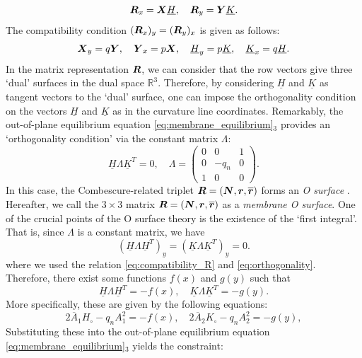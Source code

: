 \documentclass[a4paper]{amsart}
\def\br{\mbox{\boldmath $r$}}
\def\bH{\underline{H}}
\def\bK{\underline{K}}
\def\bN{\mbox{\boldmath $N$}}
\def\R{\mathbb{R}}
\def\bR{\mbox{\boldmath $R$}}
\def\bX{\mbox{\boldmath $X$}}
\def\bY{\mbox{\boldmath $Y$}}
\theoremstyle{definition}
\begin{document}
\begin{equation}
\bR_x = \bX \bH, \quad
\bR_y = \bY \bK.
\end{equation}
The compatibility condition $(\bR_x)_y = (\bR_y)_x$ is given as follows:
\begin{equation}
\label{eq:compatibility_R}
\bX_y = q \bY, \quad
\bY_x = p \bX, \quad
\bH_y = p \bK, \quad
\bK_x = q \bH.
\end{equation}
In the matrix representation $\bR$, we can consider that the row vectors give three `dual' surfaces in the dual space $\R^3$.
Therefore, by considering $\bH$ and $\bK$ as tangent vectors to the `dual' surface, one can impose the orthogonality condition on the vectors $\bH$ and $\bK$ as in the curvature line coordinates.
Remarkably, the out-of-plane equilibrium equation \eqref{eq:membrane_equilibrium}${}_3$ provides an `orthogonality condition' via the constant matrix $\Lambda$:
\begin{equation}
\label{eq:orthogonality}
\bH \Lambda \bK^T = 0, \quad
\Lambda = 
\begin{pmatrix}
0 & 0 & 1\\
0 & -q_n & 0\\
1 & 0 & 0
\end{pmatrix}.
\end{equation}
In this case, the Combescure-related triplet $\bR = (\bN, \br, \overline{\br})$ forms an \textit{O surface} \cite{schief_unification_2003}.
Hereafter, we call the $3\times 3$ matrix $\bR = (\bN, \br, \overline{\br})$ as a \textit{membrane O surface}.
One of the crucial points of the O surface theory is the existence of the `first integral'.
That is, since $\Lambda$ is a constant matrix, we have
\begin{equation}
\label{eq:HK_norm}
(\bH \Lambda \bH^T)_y = (\bK \Lambda \bK^T)_y = 0.
\end{equation}
where we used the relation \eqref{eq:compatibility_R} and \eqref{eq:orthogonality}.
Therefore, there exist some functions $f(x)$ and $g(y)$ such that
\begin{equation}
\bH \Lambda \bH^T = -f(x), \quad
\bK \Lambda \bK^T = -g(y).
\end{equation}
More specifically, these are given by the following equations:
\begin{equation}
\label{eq:first_integral}
2\overline{A}_1 H_\circ - q_n A_1^2 = - f(x), \quad
2\overline{A}_2 K_\circ - q_n A_2^2 = - g(y),
\end{equation}
Substituting these into the out-of-plane equilibrium equation \eqref{eq:membrane_equilibrium}${}_3$ yields the constraint:
\end{document}
